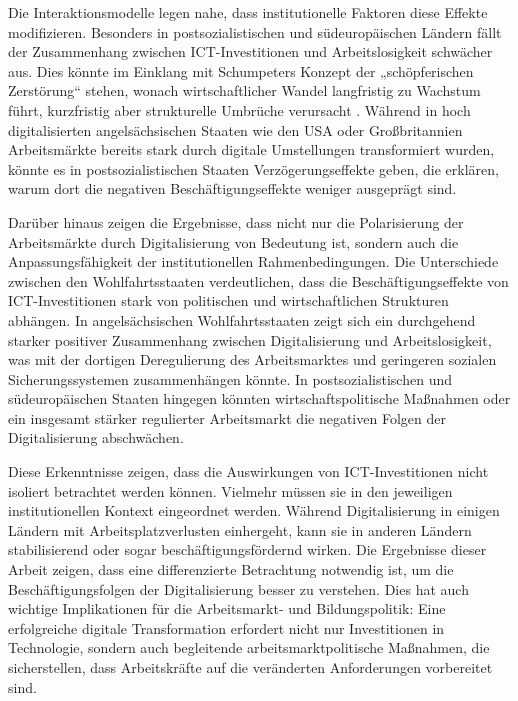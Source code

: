 Die Interaktionsmodelle legen nahe, dass institutionelle Faktoren diese Effekte modifizieren. 
Besonders in postsozialistischen und südeuropäischen Ländern fällt der Zusammenhang zwischen 
\ac{ICT}-Investitionen und Arbeitslosigkeit schwächer aus. Dies könnte im Einklang mit 
Schumpeters Konzept der „schöpferischen Zerstörung“ stehen, wonach wirtschaftlicher Wandel 
langfristig zu Wachstum führt, kurzfristig aber strukturelle Umbrüche verursacht 
\parencite[vgl.][S. 81–86]{schumpeter1976capitalism}. Während in hoch digitalisierten 
angelsächsischen Staaten wie den USA oder Großbritannien Arbeitsmärkte bereits stark durch 
digitale Umstellungen transformiert wurden, könnte es in postsozialistischen Staaten 
Verzögerungseffekte geben, die erklären, warum dort die negativen Beschäftigungseffekte weniger 
ausgeprägt sind.

Darüber hinaus zeigen die Ergebnisse, dass nicht nur die Polarisierung der Arbeitsmärkte durch 
Digitalisierung von Bedeutung ist, sondern auch die Anpassungsfähigkeit der institutionellen 
Rahmenbedingungen. Die Unterschiede zwischen den Wohlfahrtsstaaten verdeutlichen, dass die 
Beschäftigungseffekte von \ac{ICT}-Investitionen stark von politischen und wirtschaftlichen 
Strukturen abhängen. In angelsächsischen Wohlfahrtsstaaten zeigt sich ein durchgehend starker 
positiver Zusammenhang zwischen Digitalisierung und Arbeitslosigkeit, was mit der dortigen 
Deregulierung des Arbeitsmarktes und geringeren sozialen Sicherungssystemen zusammenhängen 
könnte. In postsozialistischen und südeuropäischen Staaten hingegen könnten wirtschaftspolitische 
Maßnahmen oder ein insgesamt stärker regulierter Arbeitsmarkt die negativen Folgen der 
Digitalisierung abschwächen.

Diese Erkenntnisse zeigen, dass die Auswirkungen von \ac{ICT}-Investitionen nicht isoliert 
betrachtet werden können. Vielmehr müssen sie in den jeweiligen institutionellen Kontext 
eingeordnet werden. Während Digitalisierung in einigen Ländern mit Arbeitsplatzverlusten 
einhergeht, kann sie in anderen Ländern stabilisierend oder sogar beschäftigungsfördernd wirken. 
Die Ergebnisse dieser Arbeit zeigen, dass eine differenzierte Betrachtung notwendig ist, um die 
Beschäftigungsfolgen der Digitalisierung besser zu verstehen. Dies hat auch wichtige 
Implikationen für die Arbeitsmarkt- und Bildungspolitik: Eine erfolgreiche digitale 
Transformation erfordert nicht nur Investitionen in Technologie, sondern auch begleitende 
arbeitsmarktpolitische Maßnahmen, die sicherstellen, dass Arbeitskräfte auf die veränderten 
Anforderungen vorbereitet sind.

